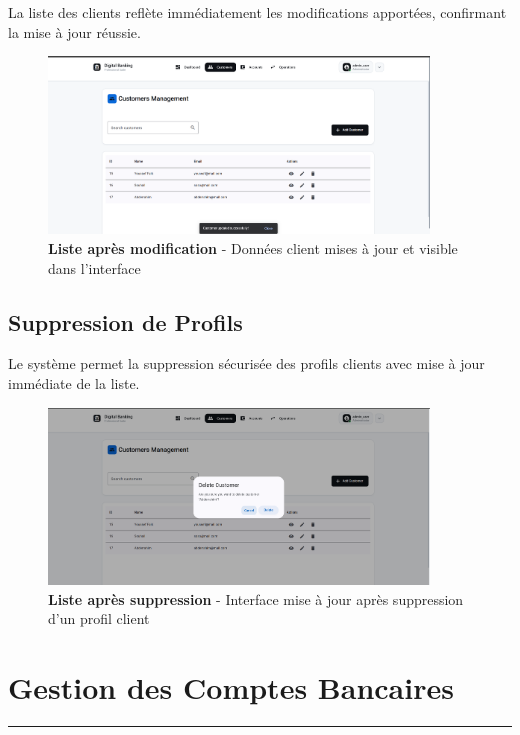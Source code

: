 \documentclass[11pt, a4paper]{article}
\newcommand{\accentline}{\textcolor{accent}{\rule{\textwidth}{1pt}}}
\begin{document}
La liste des clients reflète immédiatement les modifications apportées, confirmant la mise à jour réussie.

\begin{figure}[H]
    \centering
    \includegraphics[width=0.9\textwidth]{screenshots/04_07_customer_list_after_update.png}
    \caption{\textbf{Liste après modification} - Données client mises à jour et visible dans l'interface}
    \label{fig:customer_list_after_update}
\end{figure}

\subsection{Suppression de Profils}

Le système permet la suppression sécurisée des profils clients avec mise à jour immédiate de la liste.

\begin{figure}[H]
    \centering
    \includegraphics[width=0.9\textwidth]{screenshots/04_08_customer_list_after_delete.png}
    \caption{\textbf{Liste après suppression} - Interface mise à jour après suppression d'un profil client}
    \label{fig:customer_list_after_delete}
\end{figure}

\section{Gestion des Comptes Bancaires}
\accentline
\end{document}

